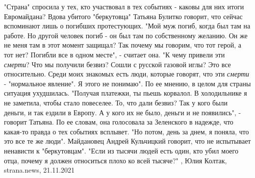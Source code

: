 "Страна" спросила у тех, кто участвовал в тех событиях - каковы для них итоги
Евромайдана?  Вдова убитого "беркутовца" Татьяна Булитко говорит, что сейчас
вспоминают лишь о погибших протестующих. "Мой муж погиб, когда был там на
работе. Но другой человек погиб - он был там по собственному желанию. Он же не
меня там в этот момент защищал? Так почему мы говорим, что тот герой, а тот
нет? Погибли все в одном месте", - считает она.  "К чему привели эти
\emph{смерти}? Что мы получили безвиз? Сошли с русской газовой иглы? Это все
относительно. Среди моих знакомых есть люди, которые говорят, что эти
\emph{смерти} - "нормальное явление". Я этого не понимаю".  По ее мнению, в
целом для страны ситуация ухудшилась. "Получая платежки, ты пьешь корвалол. В
холодильнике я не заметила, чтобы стало повеселее. То, что дали безвиз? Так у
кого были деньги, и так ездили в Европу. А у кого их не было, деньги и не
появились", - говорит Татьяна.  По ее словам, она голосовала за Зеленского в
надежде, что какая-то правда о тех событиях всплывет. "Но потом, день за днем,
я поняла, что это все те же люди".  Майдановец Андрей Кульчицкий говорит, что
не испытывает ненависти к "беркутовцам". "Если из тысячи людей есть один, кто
убил моего отца, почему я должен относиться плохо ко всей тысяче?" 
, 
Юлия Колтак, strana.news, 21.11.2021
